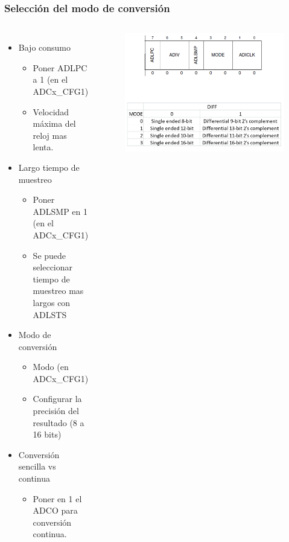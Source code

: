 \documentclass[10.5pt,scale=1.0,t,aspectratio=169,hyperref={pdfpagelabels=false}]{beamer}
\begin{document}
\begin{frame}
	\frametitle{Selección del modo de conversión}
	{\small
		\begin{columns}
			\begin{itemize}
				\setlength\itemsep{0em}
				\item Bajo consumo
				\begin{itemize}
					\item Poner ADLPC a 1 (en el ADCx\_CFG1)
					\item Velocidad máxima del reloj mas lenta.
				\end{itemize}
				\item Largo tiempo de muestreo
				\begin{itemize}
					\item Poner ADLSMP en 1 (en el ADCx\_CFG1)
					\item Se puede seleccionar tiempo de muestreo mas largos con ADLSTS
				\end{itemize}
				\item Modo de conversión
				\begin{itemize}
					\item Modo (en ADCx\_CFG1)
					\item Configurar la precisión del resultado (8 a 16 bits)
				\end{itemize}
				\item Conversión sencilla vs continua
				\begin{itemize}
					\item Poner en 1 el ADCO para conversión continua. 
				\end{itemize}
			\end{itemize}
			
			\begin{figure}
				\centering
				\includegraphics[scale=0.25]{fig_ADLS}
			\end{figure}
		\end{columns}
	}
\end{frame}
\end{document}
